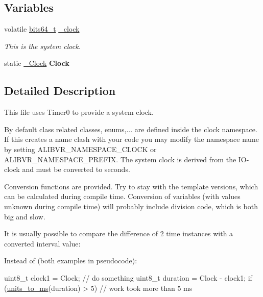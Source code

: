 \subsection*{Variables}
\begin{DoxyCompactItemize}
\item 
volatile \hyperlink{unionbits64__s}{bits64\+\_\+t} \hyperlink{namespaceclock_a0cfce972d3684eddb3dd61bb0baaf225}{\+\_\+clock}
\begin{DoxyCompactList}\small\item\em This is the system clock. \end{DoxyCompactList}\item 
\hypertarget{namespaceclock_a8414359d2fd2b9f75143850c0e3bb4b5}{}\label{namespaceclock_a8414359d2fd2b9f75143850c0e3bb4b5} 
static \hyperlink{classclock_1_1__Clock}{\+\_\+\+Clock} {\bfseries Clock}
\end{DoxyCompactItemize}


\subsection{Detailed Description}
This file uses {\ttfamily Timer0} to provide a system clock. 

By default class related classes, enums,... are defined inside the {\ttfamily clock} namespace. If this creates a name clash with your code you may modify the namespace name by setting A\+L\+I\+B\+V\+R\+\_\+\+N\+A\+M\+E\+S\+P\+A\+C\+E\+\_\+\+C\+L\+O\+CK or A\+L\+I\+B\+V\+R\+\_\+\+N\+A\+M\+E\+S\+P\+A\+C\+E\+\_\+\+P\+R\+E\+F\+IX. The system clock is derived from the I\+O-\/clock and must be converted to seconds.

Conversion functions are provided. Try to stay with the template versions, which can be calculated during compile time. Conversion of variables (with values unknown during compile time) will probably include division code, which is both big and slow.

It is usually possible to compare the difference of 2 time instances with a converted interval value\+:

Instead of (both examples in pseudocode)\+:


\begin{DoxyCode}
uint8\_t clock1 = Clock;
\textcolor{comment}{// do something}
uint8\_t duration = Clock - clock1;
\textcolor{keywordflow}{if} (\hyperlink{namespaceclock_a475b3551d89e7a345492a61f70830bd8}{units\_to\_ms}(duration) > 5) \textcolor{comment}{// work took more than 5 ms}
\end{DoxyCode}


